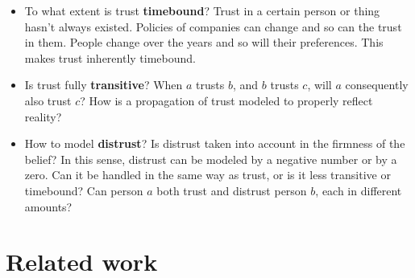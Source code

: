\documentclass{llncs}
\begin{document}
\begin{itemize}
\item To what extent is trust \textbf{timebound}? Trust in a certain person or thing hasn't always existed. Policies of companies can change and so can the trust in them. People change over the years and so will their preferences. This makes trust inherently timebound.

\item Is trust fully \textbf{transitive}? When $a$ trusts $b$, and $b$ trusts $c$, will $a$ consequently also trust $c$? How is a propagation of trust modeled to properly reflect reality?

\item How to model \textbf{distrust}? Is distrust taken into account in the firmness of the belief? In this sense, distrust can be modeled by a negative number or by a zero. Can it be handled in the same way as trust, or is it less transitive or timebound? Can person $a$ both trust and distrust person $b$, each in different amounts?
\end{itemize}


\section{Related work}
\end{document}
